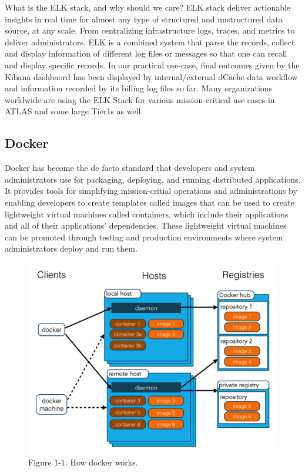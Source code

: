 \documentclass[]{article}
\begin{document}
What is the ELK stack, and why should we care? ELK stack deliver
actionable insights in real time for almost any type of structured and
unstructured data source, at any scale. From centralizing infrastructure
logs, traces, and metrics to deliver administrators. ELK is a combined
system that parse the records, collect and display information of
different log files or messages so that one can recall and display
specific records. In our practical use-case, final outcomes given by the
Kibana dashbaord has been displayed by internal/external dCache data
workflow and information recorded by its billing log files so far. Many
organizations worldwide are using the ELK Stack for various
mission-critical use cases in ATLAS and some large Tier1s as well.

\subsection{Docker}\label{docker}

Docker has become the de facto standard that developers and system
administrators use for packaging, deploying, and running distributed
applications. It provides tools for simplifying mission-critial
operations and administrations by enabling developers to create
templates called images that can be used to create lightweight virtual
machines called containers, which include their applications and all of
their applications' dependencies. These lightweight virtual machines can
be promoted through testing and production environments where system
administrators deploy and run them.

\begin{figure}[htbp]
\centering
\includegraphics{images/docker.png}
\caption{Figure 1-1. How docker works.}
\end{figure}
\end{document}
